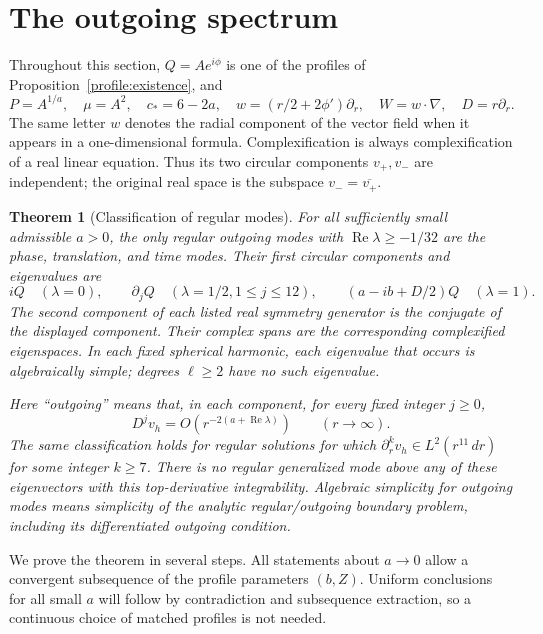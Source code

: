 \documentclass[11pt]{article}
\numberwithin{equation}{section}
\newtheorem{theorem}{Theorem}[section]
\theoremstyle{definition}
\theoremstyle{remark}
\begin{document}
\section{The outgoing spectrum}\label{sec:spectrum}

Throughout this section, $Q=Ae^{i\phi}$ is one of the profiles of
Proposition~\ref{profile:existence}, and
\[
 P=A^{1/a},\quad \mu=A^2,\quad c_*=6-2a,\quad
 w=(r/2+2\phi')\partial_r,\quad W=w\cdot\nabla,\quad D=r\partial_r.
\]
The same letter $w$ denotes the radial component of the vector field when
it appears in a one-dimensional formula. Complexification is always
complexification of a real linear equation. Thus its two circular
components $v_+,v_-$ are independent; the original real space is the
subspace $v_- =\overline{v_+}$.

\begin{theorem}[Classification of regular modes]\label{spectrum:classification}
For all sufficiently small admissible $a>0$, the only regular outgoing
modes with $\operatorname{Re}\lambda\ge-1/32$ are the phase, translation,
and time modes. Their first circular components and eigenvalues are
\[
 iQ\quad(\lambda=0),\qquad
 \partial_jQ\quad(\lambda=1/2, 1\le j\le12),\qquad
 (a-ib+D/2)Q\quad(\lambda=1).
\]
The second component of each listed real symmetry generator is the
conjugate of the displayed component. Their complex spans are the
corresponding complexified eigenspaces. In
each fixed spherical harmonic, each eigenvalue that occurs is
algebraically simple; degrees $\ell\ge2$ have no such eigenvalue.

Here ``outgoing'' means that, in each component, for every fixed integer
$j\ge0$,
\begin{equation}\label{spec:slow-condition}
 D^jv_h=O(r^{-2(a+\operatorname{Re}\lambda)})\qquad(r\longrightarrow\infty).
\end{equation}
The same classification holds for regular solutions for which
$\partial_r^kv_h\in L^2(r^{11}\,dr)$ for some integer $k\ge7$.
There is no regular generalized mode above any of these eigenvectors
with this top-derivative integrability. Algebraic simplicity for
outgoing modes means simplicity of the analytic regular/outgoing
boundary problem, including its differentiated outgoing condition.
\end{theorem}

We prove the theorem in several steps. All statements about $a\to0$
allow a convergent subsequence of the profile parameters $(b,Z)$.
Uniform conclusions for all small $a$ will follow by contradiction and
subsequence extraction, so a continuous choice of matched profiles is
not needed.
\end{document}
